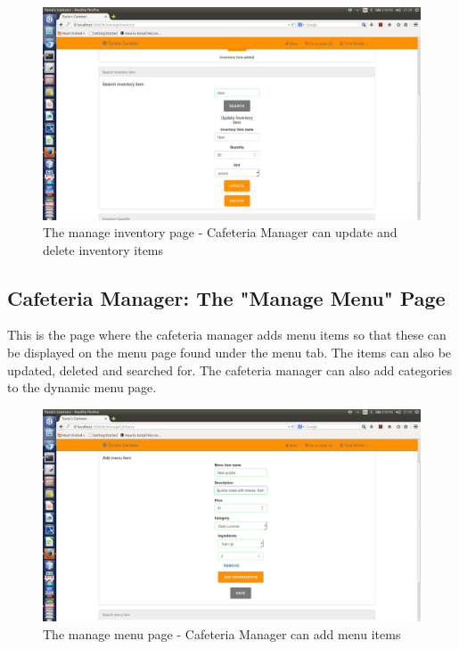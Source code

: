 \documentclass[a4paper,12pt]{report}
\begin{document}
\begin{figure}[H]
  \centering
    \includegraphics[width=1.0\textwidth]{screenshots/updateInv.png}
    \caption{The manage inventory page - Cafeteria Manager can update and delete inventory items}
\end{figure}

\subsection{Cafeteria Manager: The "Manage Menu" Page}
This is the page where the cafeteria manager adds menu items so that these can be displayed on the menu page found under the menu tab. The items can also be updated, deleted and searched for. The cafeteria manager can also add categories to the dynamic menu page.

\begin{figure}[H]
  \centering
    \includegraphics[width=1.0\textwidth]{screenshots/addMenu.png}
    \caption{The manage menu page - Cafeteria Manager can add menu items}
\end{figure}
\end{document}
